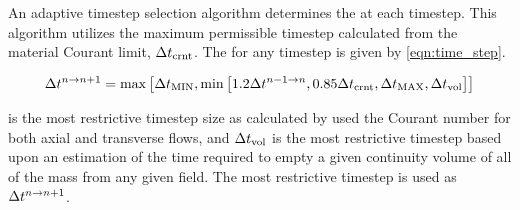 An adaptive timestep selection algorithm determines the \dt{} at each timestep.
This algorithm utilizes the maximum permissible timestep calculated from the material Courant limit, $\dtcrnt{}$.
The \dt{} for any timestep is given by \eqref{eqn:time_step}.

\begin{equation}
\label{eqn:time_step}
\dt{}^{n \rightarrow n+1} = \max\left[ \dt{}_{\text{MIN}}, \min\left[1.2 \dt{}^{n-1 \rightarrow n}, 0.85 \dtcrnt{}, \dtmax{}, \dt{}_{\text{vol}} \right]\right]
\end{equation}

\dtcrnt{} is the most restrictive timestep size as calculated by used the Courant number for both axial and transverse flows, and $\dt{}_{\text{vol}}$ is the most restrictive timestep based upon an estimation of the time required to empty a given continuity volume of all of the mass from any given field.
The most restrictive timestep is used as $\dt{}^{n \rightarrow n+1}$.
